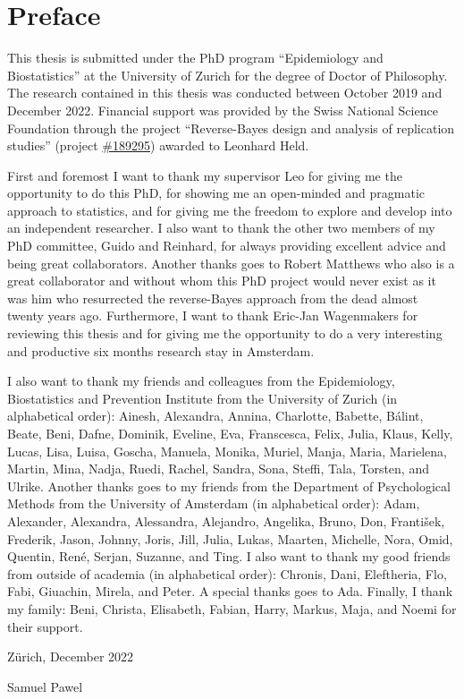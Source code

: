 \section*{Preface}

This thesis is submitted under the PhD program ``Epidemiology and
Biostatistics'' at the University of Zurich for the degree of Doctor of
Philosophy.
The research contained in this thesis was conducted between October 2019 and
December 2022. Financial support was provided by the Swiss National Science
Foundation through the project ``Reverse-Bayes design and analysis of
replication studies'' (project
\href{https://data.snf.ch/grants/grant/189295}{\#189295}) awarded to Leonhard
Held.

First and foremost I want to thank my supervisor Leo for giving me the
opportunity to do this PhD, for showing me an open-minded and pragmatic approach
to statistics, and for giving me the freedom to explore and develop into an
independent researcher. I also want to thank the other two members of my PhD
committee, Guido and Reinhard, for always providing excellent advice and being
great collaborators. Another thanks goes to Robert Matthews who also is a great
collaborator and without whom this PhD project would never exist as it was him
who resurrected the reverse-Bayes approach from the dead almost twenty years
ago. Furthermore, I want to thank Eric-Jan Wagenmakers for reviewing this thesis
and for giving me the opportunity to do a very interesting and productive six
months research stay in Amsterdam.

I also want to thank my friends and colleagues from the Epidemiology,
Biostatistics and Prevention Institute from the University of Zurich (in
alphabetical order): Ainesh, Alexandra, Annina, Charlotte, Babette, Bálint,
Beate, Beni, Dafne, Dominik, Eveline, Eva, Franscesca, Felix, Julia, Klaus,
Kelly, Lucas, Lisa, Luisa, Goscha, Manuela, Monika, Muriel, Manja, Maria,
Marielena, Martin, Mina, Nadja, Ruedi, Rachel, Sandra, Sona, Steffi, Tala,
Torsten, and Ulrike. Another thanks goes to my friends from the Department of
Psychological Methods from the University of Amsterdam (in alphabetical order):
Adam, Alexander, Alexandra, Alessandra, Alejandro, Angelika, Bruno, Don,
František, Frederik, Jason, Johnny, Joris, Jill, Julia, Lukas, Maarten,
Michelle, Nora, Omid, Quentin, René, Serjan, Suzanne, and Ting. I also want to
thank my good friends from outside of academia (in alphabetical order): Chronis,
Dani, Eleftheria, Flo, Fabi, Giuachin, Mirela, and Peter. A special thanks goes
to Ada. Finally, I thank my family: Beni, Christa, Elisabeth, Fabian, Harry,
Markus, Maja, and Noemi for their support.

\begin{flushright}
  \hfill Zürich, December 2022

  \hfill Samuel Pawel
\end{flushright}

